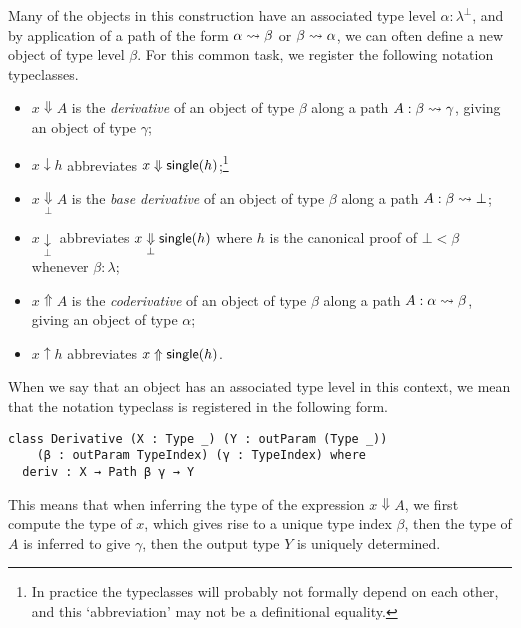 Many of the objects in this construction have an associated type level \( \alpha : \lambda^\bot \), and by application of a path of the form \( \alpha \rightsquigarrow \beta \) or \( \beta \rightsquigarrow \alpha \), we can often define a new object of type level \( \beta \).
For this common task, we register the following notation typeclasses.
\begin{itemize}
  \item \( x \Downarrow A \) is the \emph{derivative} of an object of type \( \beta \) along a path \( A : \beta \rightsquigarrow \gamma \), giving an object of type \( \gamma \);
  \item \( x \downarrow h \) abbreviates \( x \Downarrow \operatorname{\mathsf{single}}(h) \);\footnote{In practice the typeclasses will probably not formally depend on each other, and this `abbreviation' may not be a definitional equality.}
  \item \( x \underset{\bot}{\Downarrow} A \) is the \emph{base derivative} of an object of type \( \beta \) along a path \( A : \beta \rightsquigarrow \bot \);
  \item \( x \underset{\bot}{\downarrow} \) abbreviates \( x \underset{\bot}{\Downarrow} \operatorname{\mathsf{single}}(h) \) where \( h \) is the canonical proof of \( \bot < \beta \) whenever \( \beta : \lambda \);
  \item \( x \Uparrow A \) is the \emph{coderivative} of an object of type \( \beta \) along a path \( A : \alpha \rightsquigarrow \beta \), giving an object of type \( \alpha \);
  \item \( x \uparrow h \) abbreviates \( x \Uparrow \operatorname{\mathsf{single}}(h) \).
\end{itemize}

When we say that an object has an associated type level in this context, we mean that the notation typeclass is registered in the following form.

\begin{verbatim}
class Derivative (X : Type _) (Y : outParam (Type _))
    (β : outParam TypeIndex) (γ : TypeIndex) where
  deriv : X → Path β γ → Y
\end{verbatim}

This means that when inferring the type of the expression \( x \Downarrow A \), we first compute the type of \( x \), which gives rise to a unique type index \( \beta \), then the type of \( A \) is inferred to give \( \gamma \), then the output type \( Y \) is uniquely determined.

